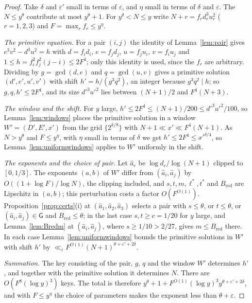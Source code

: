 \documentclass[11pt,reqno]{amsart}
\theoremstyle{definition}
\theoremstyle{remark}
\numberwithin{equation}{section}
\newcommand{\Bred}{B_{\mathrm{red}}}
\newcommand{\lst}{\ell^{*}}
\newcommand{\tst}{t^{*}}
\begin{document}
\begin{proof}
Take $\delta$ and $\varepsilon'$ small in terms of $\varepsilon$, and $\eta$
small in terms of $\delta$ and $\varepsilon$. The $N\le y^\theta$ contribute at
most $y^\theta+1$. For $y^\theta<N\le y$ write $N+r=f_rd_r^3u_r^2$
($r=1,2,3$) and $F=\max_rf_r\le y^\eta$.

\emph{The primitive equation.} For a pair $(i,j)$ the identity of
Lemma~\ref{lem:pair} gives $e^3v^2-d^3u^2=h$ with $d=f_id_i$, $e=f_jd_j$,
$u=f_ju_i$, $v=f_iu_j$ and $1\le h=f_i^2f_j^2(j-i)\le2F^4$; only this identity
is used, since the $f_r$ are arbitrary. Dividing by $g=\gcd(d,e)$ and
$q=\gcd(u,v)$ gives a primitive solution $(d',e',u',v')$ with shift
$h'=h/(g^3q^2)$, an integer because $g^3q^2\mid h$; so $g,q,h'\le2F^4$, and
its size $d'^3u'^2$ lies between $(N+1)/2$ and $F^4(N+3)$.

\emph{The window and the shift.} For $y$ large,
$h'\le2F^4\le(N+1)/200\le d'^3u'^2/100$, so Lemma~\ref{lem:windows} places the
primitive solution in a window $W'=(D',E',x')$ from the grid $\{2^{k/8}\}$ with
$N+1\ll x'\ll F^4(N+1)$. As $N>y^\theta$ and $F\le y^\eta$, with $\eta$ small
in terms of $\delta$ we get $h'\le2F^4\le x'^{\delta/4}$, so
Lemma~\ref{lem:uniformwindows} applies to $W'$ uniformly in the shift.

\emph{The exponents and the choice of pair.} Let $\hat a_r$ be $\log d_r/\log(N+1)$
clipped to $[0,1/3]$. The exponents $(a,b)$ of $W'$ differ from
$(\hat a_i,\hat a_j)$ by $O((1+\log F)/\log N)$, the clipping included, and
$s,t,m,\lst,\tst$ and $\Bred$ are Lipschitz in $(a,b)$; this perturbation
costs a factor $O(F^{O(1)})$.
Proposition~\ref{prop:certs}(i) at $(\hat a_1,\hat a_2,\hat a_3)$ selects a
pair with $s\le\theta$, or $t\le\theta$, or $(\hat a_i,\hat a_j)\in\mathsf G$
and $\Bred\le\theta$; in the last case $s,t\ge c=1/20$ for $y$ large, and
Lemma~\ref{lem:Bredm} at $(\hat a_i,\hat a_j)$, where $s\ge1/10>2/27$, gives
$m\le\Bred$ there. In each case Lemma~\ref{lem:uniformwindows} bounds the
primitive solutions in $W'$ with shift $h'$ by
$\ll_\varepsilon F^{O(1)}(N+1)^{\theta+\varepsilon'+2\delta}$.

\emph{Summation.} The key consisting of the pair, $g$, $q$ and the window
$W'$ determines $h'$, and together with the primitive solution it determines
$N$. There are $O(F^8(\log y)^3)$ keys. The total is therefore
$y^\theta+1+F^{O(1)}(\log y)^3y^{\theta+\varepsilon'+2\delta}$, and with
$F\le y^\eta$ the choice of parameters makes the exponent less than
$\theta+\varepsilon$.
\end{proof}
\end{document}
